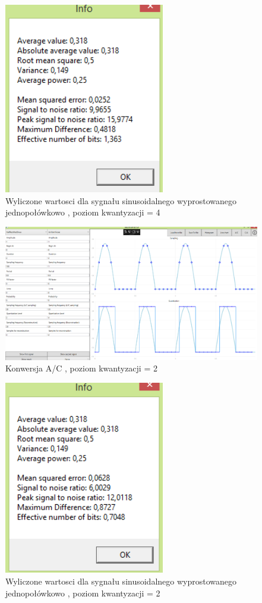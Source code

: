 \documentclass[12pt]{article}
\begin{document}
\begin{figure}[H]
 \centering
 \includegraphics[width=7cm]{images/hsininfo.PNG}
 \vspace{-0.3cm}
 \caption{Wyliczone wartosci dla sygnału sinusoidalnego wyprostowanego jednopołówkowo  , poziom kwantyzacji = 4}
 \label{gui}
\end{figure}

\begin{figure}[H]
 \centering
 \includegraphics[width=14cm]{images/hsinac1.PNG}
 \vspace{-0.3cm}
 \caption{Konwersja A/C , poziom kwantyzacji = 2}
 \label{gui}
\end{figure}

\begin{figure}[H]
 \centering
 \includegraphics[width=7cm]{images/hsininfo1.PNG}
 \vspace{-0.3cm}
 \caption{Wyliczone wartosci dla sygnału sinusoidalnego wyprostowanego jednopołówkowo  , poziom kwantyzacji = 2}
 \label{gui}
\end{figure}
\end{document}
